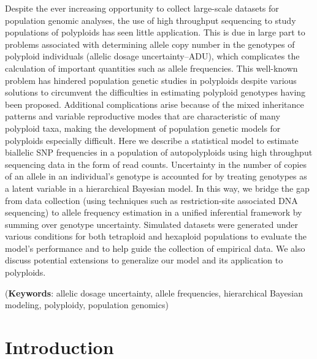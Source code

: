 \documentclass[11pt,english,letterpaper,oneside]{article}
\begin{document}
Despite the ever increasing opportunity to collect large-scale datasets for population genomic analyses, the use of high throughput sequencing to study populations of polyploids has seen little application. This is due in large part to problems associated with determining allele copy number in the genotypes of polyploid individuals (allelic dosage uncertainty--ADU), which complicates the calculation of important quantities such as allele frequencies. This well-known problem has hindered population genetic studies in polyploids despite various solutions to circumvent the difficulties in estimating polyploid genotypes having been proposed. Additional complications arise because of the mixed inheritance patterns and variable reproductive modes that are characteristic of many polyploid taxa, making the development of population genetic models for polyploids especially difficult. Here we describe a statistical model to estimate biallelic SNP frequencies in a population of autopolyploids using high throughput sequencing data in the form of read counts. Uncertainty in the number of copies of an allele in an individual's genotype is accounted for by treating genotypes as a latent variable in a hierarchical Bayesian model. In this way, we bridge the gap from data collection (using techniques such as restriction-site associated DNA sequencing) to allele frequency estimation in a unified inferential framework by summing over genotype uncertainty. Simulated datasets were generated under various conditions for both tetraploid and hexaploid populations to evaluate the model's performance and to help guide the collection of empirical data. We also discuss potential extensions to generalize our model and its application to polyploids.
\vspace{0.25in}

\noindent (\textbf{Keywords}: allelic dosage uncertainty, allele frequencies, hierarchical Bayesian modeling, polyploidy, population genomics)
\vspace{0.25in}

\section*{Introduction}            %
\end{document}
